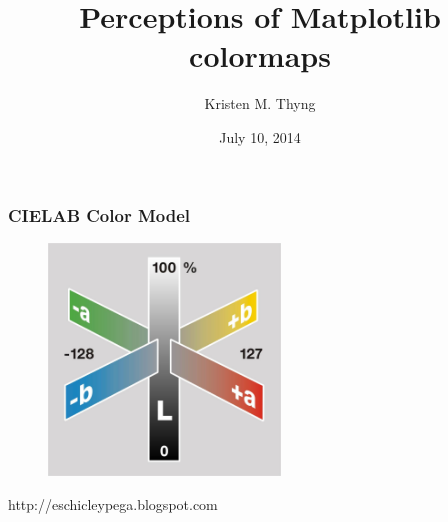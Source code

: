 \documentclass[ignorenonframetext]{beamer}
\title[SciPy 2014]{Perceptions of Matplotlib colormaps}
\author{Kristen M. Thyng}
\date{July 10, 2014}
\institute[Texas A\&M]{Texas A\&M University}
\begin{document}
\begin{frame}
    \titlepage
\end{frame}





\section{}

\begin{frame}[t]\frametitle{CIELAB Color Model}
    \begin{figure}[htbp]
        \centering
        \includegraphics[width=0.55\textwidth]{figures/Cielab.jpg}
    \end{figure}
    \tiny{http://eschicleypega.blogspot.com}
\end{frame}
\end{document}
